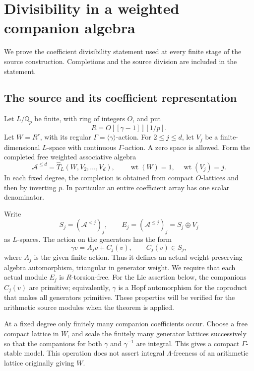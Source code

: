 \section{Divisibility in a weighted companion algebra}
\label{sec:weighted-companion-saturation}

We prove the coefficient divisibility statement used at every finite
stage of the source construction.  Completions and the source division
are included in the statement.

\subsection{The source and its coefficient representation}

Let \(L/\mathbb Q_p\) be finite, with ring of integers \(O\), and put
\[
 R=O[[\gamma-1]][1/p].
\]
Let \(W=R^r\), with its regular \(\Gamma=\langle\gamma\rangle\)-action.
For \(2\leq j\leq d\), let \(V_j\) be a finite-dimensional
\(L\)-space with continuous \(\Gamma\)-action.  A zero space is allowed.
Form the completed free weighted associative algebra
\[
 \mathcal A^{\leq d}
   =\widehat T_L(W,V_2,\ldots,V_d),
 \qquad \operatorname{wt}(W)=1,\quad
 \operatorname{wt}(V_j)=j.
\]
In each fixed degree, the completion is obtained from compact
\(O\)-lattices and then by inverting \(p\).  In particular an entire
coefficient array has one scalar denominator.

Write
\[
 S_j=(\mathcal A^{<j})_j,\qquad
 E_j=(\mathcal A^{\leq j})_j=S_j\oplus V_j
\]
as \(L\)-spaces.  The action on the generators has the form
\begin{equation}\label{eq:wcs-action}
 \gamma v=A_jv+C_j(v),\qquad C_j(v)\in S_j,
\end{equation}
where \(A_j\) is the given finite action.  Thus it defines an actual
weight-preserving algebra automorphism, triangular in generator
weight.  We require that each actual module \(E_j\) is \(R\)-torsion-free.
For the Lie assertion below, the companions \(C_j(v)\) are primitive;
equivalently, \(\gamma\) is a Hopf automorphism for the coproduct that
makes all generators primitive.  These properties will be verified
for the arithmetic source modules when the theorem is applied.

At a fixed degree only finitely many companion coefficients occur.
Choose a free compact lattice in \(W\), and scale the finitely many
generator lattices successively so that the companions for both
\(\gamma\) and \(\gamma^{-1}\) are integral.  This gives a compact
\(\Gamma\)-stable model.  This operation does not assert integral
\(\Lambda\)-freeness of an arithmetic lattice originally giving \(W\).

